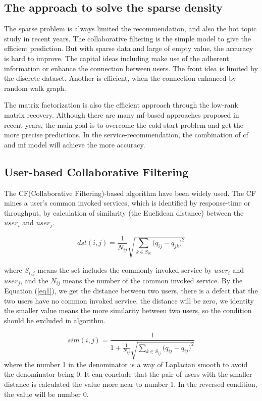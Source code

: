 \documentclass[conference]{IEEEtran}
\begin{document}
\subsection{The approach to solve the sparse density}
\par The sparse problem is always limited the recommendation, and also the hot topic study in recent years. The collaborative filtering is the simple model to give the efficient prediction. But with sparse data and large of empty value, the accuracy is hard to improve. The capital ideas including make use of the adherent information or enhance the connection between users. The front idea is limited by the discrete dataset. Another is efficient, when the connection enhanced by random walk graph. 
\par The matrix factorization is also the efficient approach through the low-rank matrix recovery. Although there are many mf-based approaches proposed in recent years, the main goal is to overcome the cold start problem and get the more precise predictions. In the service-recommendation, the combination of cf and mf model will achieve the more accuracy.      

\subsection{User-based Collaborative Filtering}
The CF(Collaborative Filtering)-based algorithm have been widely used. The CF mines a user's common invoked services, which is identified by response-time or throughput, by calculation of similarity (the Euclidean distance) between the $user_i$ and $user_j$.

\begin{equation}
dst(i,j)=\frac{1}{
  N_{ij}}\sqrt{\sum_{k \in S_{ik}}{(q_{ij}-q_{jk}})^{2}
} \label{eq1}
\end{equation}

where $S_{i,j}$ means the set includes the commonly invoked service by $user_{i}$ and $user_{j}$, and the $N_{ij}$ means the number of the common invoked service. By the Equation (\ref{eq1}), we get the distance between two users, there is a defect that the two users have no common invoked service, the distance will be zero, we identity the smaller value  means the more similarity between two users, so the condition should be excluded in algorithm. 

\begin{equation}
sim(i,j)=\frac{1}{
  1+\frac{1}{N_{ij}}\sqrt{\sum_{k \in S_{ij}}{(q_{ij}-q_{ij}})^{2}}
}  \label{eq2}
\end{equation}
where the number 1 in the denominator is a way of Laplacian smooth to avoid the denominator being 0. It can conclude that the pair of users with the smaller distance is calculated the value more near to number 1. In the reversed condition, the value will be number 0.
\end{document}
